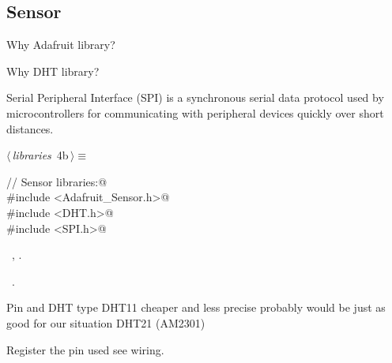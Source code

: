 \documentclass[a4paper, 12pt]{article}
\begin{document}
\subsection{Sensor}

Why Adafruit library?

Why DHT library?

Serial Peripheral Interface (SPI) is a synchronous serial data protocol
used by microcontrollers for communicating with peripheral devices quickly over short distances.

\begin{flushleft} \small
\begin{minipage}{\linewidth}\label{scrap2}\raggedright\small
{}$\langle\,${\itshape libraries}\nobreak\ {\footnotesize{4b}}$\,\rangle\equiv$
\vspace{-1ex}
\begin{list}{}{\setlength{\leftmargin}{1em}} \item
\mbox{}\lstinline@// Sensor libraries:@\\
\mbox{}\lstinline@#include <Adafruit_Sensor.h>@\\
\mbox{}\lstinline@#include <DHT.h>@\\
\mbox{}\lstinline@#include <SPI.h>@\\
\mbox{}{\NWsep}
\end{list}
\vspace{-1ex}
\vspace{-1ex}
\footnotesize
\begin{list}{}{\setlength{\itemsep}{-\parsep}\setlength{\itemindent}{-\leftmargin}}
\item \NWtxtMacroDefBy\ , .
\item \NWtxtMacroRefIn\ .
\end{list}
\end{minipage}
\end{flushleft}

Pin and DHT type
DHT11 cheaper and less precise probably would be just as good for our situation
DHT21 (AM2301)

Register the pin used see wiring.
\end{document}
